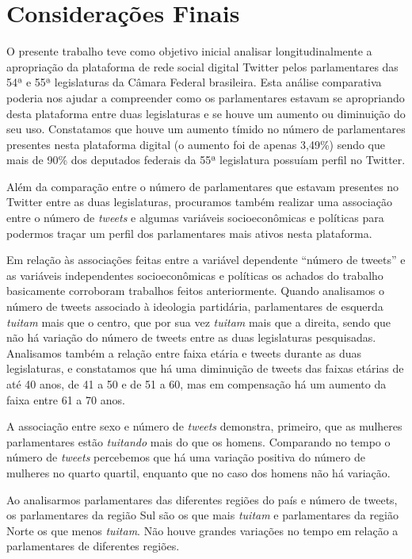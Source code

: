 \section{Considerações Finais}

O presente trabalho teve como objetivo inicial analisar
longitudinalmente a apropriação da plataforma de rede social digital
Twitter pelos parlamentares das 54ª e 55ª legislaturas da Câmara Federal
brasileira. Esta análise comparativa poderia nos ajudar a compreender
como os parlamentares estavam se apropriando desta plataforma entre duas
legislaturas e se houve um aumento ou diminuição do seu uso. Constatamos
que houve um aumento tímido no número de parlamentares presentes nesta
plataforma digital (o aumento foi de apenas 3,49\%) sendo que mais de
90\% dos deputados federais da 55ª legislatura possuíam perfil no
Twitter.

Além da comparação entre o número de parlamentares que estavam presentes
no Twitter entre as duas legislaturas, procuramos também realizar uma
associação entre o número de \emph{tweets} e algumas variáveis
socioeconômicas e políticas para podermos traçar um perfil dos
parlamentares mais ativos nesta plataforma.

Em relação às associações feitas entre a variável dependente ``número de
tweets'' e as variáveis independentes socioeconômicas e políticas os
achados do trabalho basicamente corroboram trabalhos feitos
anteriormente. Quando analisamos o número de tweets associado à
ideologia partidária, parlamentares de esquerda \emph{tuitam} mais que o
centro, que por sua vez \emph{tuitam} mais que a direita, sendo que não
há variação do número de tweets entre as duas legislaturas pesquisadas.
Analisamos também a relação entre faixa etária e tweets durante as duas
legislaturas, e constatamos que há uma diminuição de tweets das faixas
etárias de até 40 anos, de 41 a 50 e de 51 a 60, mas em compensação há
um aumento da faixa entre 61 a 70 anos.

A associação entre sexo e número de \emph{tweets} demonstra, primeiro,
que as mulheres parlamentares estão \emph{tuitando} mais do que os
homens. Comparando no tempo o número de \emph{tweets} percebemos que há
uma variação positiva do número de mulheres no quarto quartil, enquanto
que no caso dos homens não há variação.

Ao analisarmos parlamentares das diferentes regiões do país e número de
tweets, os parlamentares da região Sul são os que mais \emph{tuitam} e
parlamentares da região Norte os que menos \emph{tuitam}. Não houve
grandes variações no tempo em relação a parlamentares de diferentes
regiões.


